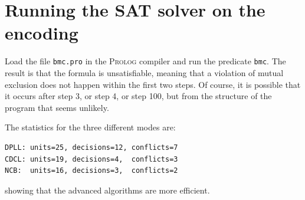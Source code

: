 \documentclass[11pt]{report}
\newcommand*{\p}[1]{\textup{\texttt{#1}}}
\newcommand*{\pl}{\textsc{Prolog}}
\begin{document}
\section{Running the SAT solver on the encoding}

Load the file \p{bmc.pro} in the \pl{} compiler and run the predicate
\p{bmc}. The result is that the formula is unsatisfiable, meaning that a
violation of mutual exclusion does not happen within the first two
steps. Of course, it is possible that it occurs after step 3, or step 4,
or step 100, but from the structure of the program that seems unlikely.

The statistics for the three different modes are:
\begin{verbatim}
DPLL: units=25, decisions=12, conflicts=7
CDCL: units=19, decisions=4,  conflicts=3
NCB:  units=16, decisions=3,  conflicts=2
\end{verbatim}
showing that the advanced algorithms are more efficient.
\end{document}
